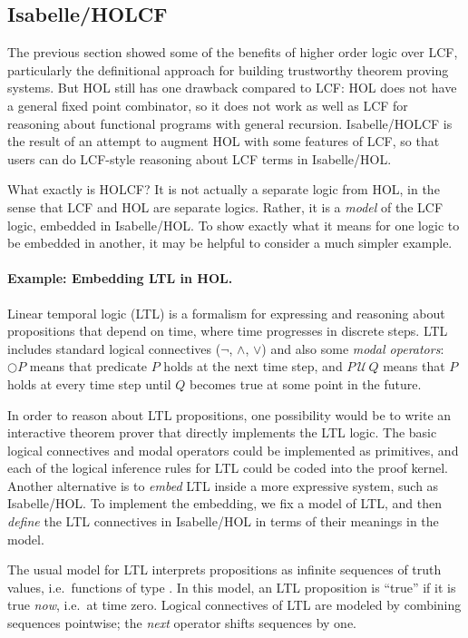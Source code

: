 \subsection{Isabelle/HOLCF}
\label{sec:intro-holcf}

The previous section showed some of the benefits of higher order logic over LCF, particularly the definitional approach for building trustworthy theorem proving systems. But HOL still has one drawback compared to LCF: HOL does not have a general fixed point combinator, so it does not work as well as LCF for reasoning about functional programs with general recursion. Isabelle/HOLCF is the result of an attempt to augment HOL with some features of LCF, so that users can do LCF-style reasoning about LCF terms in Isabelle/HOL.

What exactly is HOLCF? It is not actually a separate logic from HOL, in the sense that LCF and HOL are separate logics. Rather, it is a \emph{model} of the LCF logic, embedded in Isabelle/HOL. To show exactly what it means for one logic to be embedded in another, it may be helpful to consider a much simpler example.

\paragraph{Example: Embedding LTL in HOL.}

Linear temporal logic (LTL) is a formalism for expressing and reasoning about propositions that depend on time, where time progresses in discrete steps. LTL includes standard logical connectives ($\neg$, $\wedge$, $\vee$) and also some \emph{modal operators}:  $\bigcirc P$ means that predicate $P$ holds at the next time step, and $P\,\mathcal{U}\,Q$ means that $P$ holds at every time step until $Q$ becomes true at some point in the future.

In order to reason about LTL propositions, one possibility would be to write an interactive theorem prover that directly implements the LTL logic. The basic logical connectives and modal operators could be implemented as primitives, and each of the logical inference rules for LTL could be coded into the proof kernel. Another alternative is to \emph{embed} LTL inside a more expressive system, such as Isabelle/HOL. To implement the embedding, we fix a model of LTL, and then \emph{define} the LTL connectives in Isabelle/HOL in terms of their meanings in the model.

The usual model for LTL interprets propositions as infinite sequences of truth values, i.e.\ functions of type . In this model, an LTL proposition is ``true'' if it is true \emph{now}, i.e.\ at time zero. Logical connectives of LTL are modeled by combining sequences pointwise; the \emph{next} operator shifts sequences by one.


